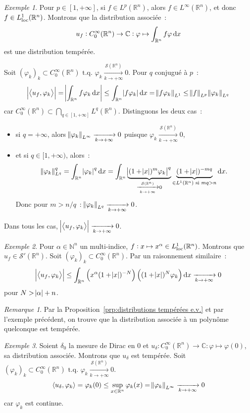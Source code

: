 \documentclass{report}
\newcommand{\C}{{\mathbb C}}
\newcommand{\R}{{\mathbb R}}
\newcommand{\N}{{\mathbb N}}
\newcommand{\scpr}[2]{\left\langle#1, #2\right\rangle}
\newcommand{\tq}{\text{ t.q. }}
\newcommand{\st}{\tq}
\newcommand{\pinfty}{{+\infty}}
\newcommand{\loc}{{\text{\textnormal{loc}}}}
\theoremstyle{definition}
\theoremstyle{remark}
\newtheorem*{rmq}{Remarque}
\newtheorem{ex}{Exemple}[chapter]
\begin{document}
\begin{ex} Pour $p \in [1, \pinfty]$, si $f \in L^p(\R^n)$, alors $f \in L^\infty(\R^n)$, et donc $f \in L^1_\loc(\R^n)$. Montrons que la distribution associée~:
\[u_f : C^\infty_0(\R^n) \to \C : \varphi \mapsto \int_{\R^n}f\varphi\dif x\]
est une distribution tempérée.

Soit $(\varphi_k)_k \subset C^\infty_0(\R^n) \st \varphi_k \xrightarrow[k \to \pinfty]{\mathcal S(\R^n)} 0$. Pour $q$ conjugué à $p$~:
\[\abs {\scpr {u_f}{\varphi_k}} = \abs {\int_{\R^n}f\varphi_k\dif x} \leq \int_{\R^n}\abs {f\varphi_k}\dif x = \norm {f\varphi_k}_{L^1} \leq \norm f_{L^p}\norm {\varphi_k}_{L^q}\]
car $C^\infty_0(\R^n) \subset \bigcap_{q \in [1, \pinfty]}L^q(\R^n)$. Distinguons les deux cas~:
\begin{itemize}
	\item si $q = \pinfty$, alors $\norm {\varphi_k}_{L^\infty} \xrightarrow[k \to \pinfty]{} 0$ puisque $\varphi_k \xrightarrow[k \to \pinfty]{\mathcal S(\R^n)} 0$,
	\item et si $q \in [1, \pinfty)$, alors~:
	\[\norm {\varphi_k}_{L^q}^q = \int_{\R^n}\abs {\varphi_k}^q\dif x
	= \int_{\R^n}\underbrace {\abs {(1+\abs x)^m\varphi_k}^q}_{\xrightarrow[k \to \pinfty]{\mathcal S(\R^n)} 0}\underbrace {(1+\abs x)^{-mq}}_{\in L^1(\R^n) \text{ si } mq > n}\dif x.\]
	Donc pour $m > n/q$~: $\norm {\varphi_k}_{L^q} \xrightarrow[k \to \pinfty]{} 0$.
\end{itemize}

Dans tous les cas, $\abs {\scpr {u_f}{\varphi_k}} \xrightarrow[k \to \pinfty]{} 0$.
\end{ex}

\begin{ex} Pour $\alpha \in \N^n$ un multi-indice, $f : x \mapsto x^\alpha \in L^1_\loc(\R^n)$. Montrons que $u_f \in \mathcal S'(\R^n)$. Soit $(\varphi_k)_k \subset C^\infty_0(\R^n)$.
Par un raisonnement similaire~:
\[\abs {\scpr {u_f}{\varphi_k}} \leq \int_{\R^n} \left(x^\alpha(1+\abs x)^{-N}\right)\left((1+\abs x)^N\varphi_k\right)\dif x \xrightarrow[k \to \pinfty]{} 0\]
pour $N > \abs \alpha + n$.
\end{ex}

\begin{rmq} Par la Proposition~\ref{prp:distributions tempérées e.v.} et par l'exemple précédent, on trouve que la distribution associée à un polynôme quelconque est tempérée.
\end{rmq}

\begin{ex} Soient $\delta_0$ la mesure de Dirac en $0$ et $u_\delta : C^\infty_0(\R^n) \to \C : \varphi \mapsto \varphi(0)$, sa distribution associée. Montrons que $u_\delta$
est tempérée. Soit $(\varphi_k)_k \subset C^\infty_0(\R^n) \st \varphi_k \xrightarrow[k \to \pinfty]{\mathcal S(\R^n)} 0$.
\[\scpr {u_\delta}{\varphi_k} = \varphi_k(0) \leq \sup_{x \in \R^n}\varphi_k(x) = \norm {\varphi_k}_{L^\infty} \xrightarrow[k \to \pinfty]{} 0\]
car $\varphi_k$ est continue.
\end{ex}
\end{document}

